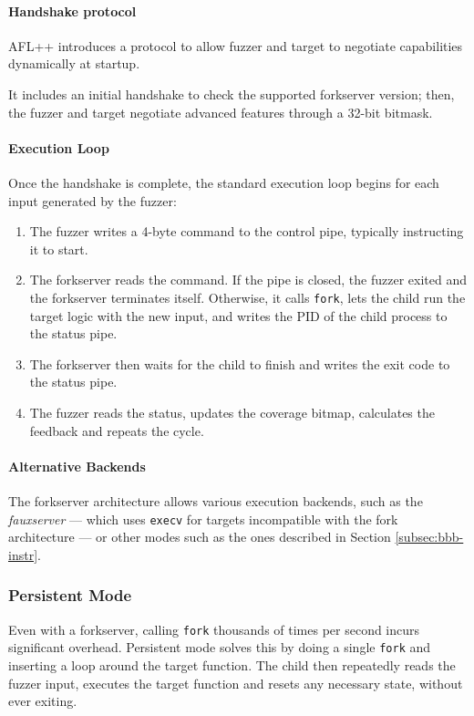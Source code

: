 \paragraph{Handshake protocol} AFL++ introduces a protocol to allow fuzzer and target to negotiate capabilities dynamically at startup.

It includes an initial handshake to check the supported forkserver version; then, the fuzzer and target negotiate advanced features through a 32-bit bitmask.

\paragraph{Execution Loop} Once the handshake is complete, the standard execution loop begins for each input generated by the fuzzer: 
\begin{enumerate}
    \item The fuzzer writes a 4-byte command to the control pipe, typically instructing it to start.

    \item The forkserver reads the command. If the pipe is closed, the fuzzer exited and the forkserver terminates itself. Otherwise, it calls \texttt{fork}, lets the child run the target logic with the new input, and writes the PID of the child process to the status pipe.

    \item The forkserver then waits for the child to finish and writes the exit code to the status pipe.

    \item The fuzzer reads the status, updates the coverage bitmap, calculates the feedback and repeats the cycle.
\end{enumerate}

\paragraph{Alternative Backends} The forkserver architecture allows various execution backends, such as the \textit{fauxserver} --- which uses \texttt{execv} for targets incompatible with the fork architecture --- or other modes such as the ones described in Section \ref{subsec:bbb-instr}.

\subsubsection{Persistent Mode}

Even with a forkserver, calling \texttt{fork} thousands of times per second incurs significant overhead. Persistent mode solves this by doing a single \texttt{fork} and inserting a loop around the target function. The child then repeatedly reads the fuzzer input, executes the target function and resets any necessary state, without ever exiting. 

